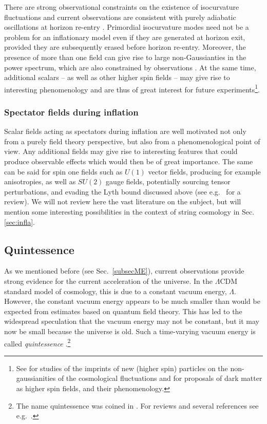There are strong observational constraints on the existence of isocurvature fluctuations and current observations are consistent with purely adiabatic oscillations at horizon re-entry  \cite{Planck:2018vyg,Planck:2018jri}. Primordial isocurvature modes need not be a problem for an inflationary model even if they are generated at horizon exit, provided they are subsequently erased before horizon re-entry. Moreover, the presence of more than one field can give rise to large non-Gaussianties in the power spectrum, which are also constrained by observations \cite{Planck:2019kim}. At the same time, additional scalars -- as well as other higher spin fields -- may give rise to interesting phenomenology and are thus of great interest for future 
%
experiments\footnote{See \cite{Arkani-Hamed:2015bza,Lee:2016vti,Alexander:2019vtb} for studies  of the imprints of new (higher spin) particles on the non-gaussianities of the cosmological fluctuations and \cite{Alexander:2020gmv,Criado:2020jkp,Jenks:2022wtj,Gondolo:2021fqo} for proposals of dark matter as higher spin fields, and their phenomenology.
}.

\subsubsection{Spectator fields during inflation}

Scalar fields acting as spectators during inflation are well motivated not only from a purely field theory perspective, but also from a phenomenological point of view. Any additional fields may give rise to interesting features that could produce observable effects which would then be of great importance. The same can be said for spin one fields such as $U(1)$ vector fields, producing for example   anisotropies, as well as $SU(2)$ gauge fields, potentially sourcing  tensor perturbations, and evading the Lyth bound discussed above (see e.g.~\cite{Maleknejad:2012fw} for a review).
We will not review here the vast literature on the subject, but will mention some interesting possibilities in the context of string cosmology in Sec. \ref{sec:infla}.

\subsection{Quintessence}\label{sec:quint}

As we mentioned before (see Sec.~\ref{subsecME}),  current observations provide strong evidence for the current acceleration of the universe.
In the $\Lambda$CDM standard model of cosmology, this is due to a constant vacuum energy, $\Lambda$.
However, the constant vacuum energy appears to be  much smaller than  would be expected from estimates based on quantum field theory. This has led to the  widespread speculation that the vacuum energy may not be constant, but it may now be small because the universe is old. Such a  time-varying vacuum energy is called {\em quintessence} \cite{Wetterich:1987fm,Peebles:1987ek,Ratra:1987rm}.\footnote{The name quintessence was coined in \cite{Caldwell:1997ii}. For reviews and several references see e.g.~\cite{Copeland:2006wr,Linder:2007wa,Tsujikawa:2013fta}.}

